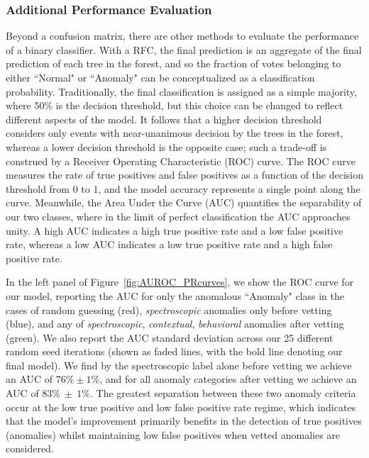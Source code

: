 \documentclass[twocolumn]{aastex63}
\begin{document}
\subsubsection{Additional Performance Evaluation}
\label{subsubsec:add_performance}
Beyond a confusion matrix, there are other methods to evaluate the performance of a binary classifier. With a RFC, the final prediction is an aggregate of the final prediction of each tree in the forest, and so the fraction of votes belonging to either ``Normal" or ``Anomaly" can be conceptualized as a classification probability. Traditionally, the final classification is assigned as a simple majority, where 50\% is the decision threshold, but this choice can be changed to reflect different aspects of the model. It follows that a higher decision threshold considers only events with near-unanimous decision by the trees in the forest, whereas a lower decision threshold is the opposite case; such a trade-off is construed by a Receiver Operating Characteristic (ROC) curve. The ROC curve measures the rate of true positives and false positives as a function of the decision threshold from 0 to 1, and the model accuracy represents a single point along the curve. Meanwhile, the Area Under the Curve (AUC) quantifies the separability of our two classes, where in the limit of perfect classification the AUC approaches unity. A high AUC indicates a high true positive rate and a low false positive rate, whereas a low AUC indicates a low true positive rate and a high false positive rate. \par

In the left panel of Figure~\ref{fig:AUROC_PRcurves}, we show the ROC curve for our model, reporting the AUC for only the anomalous ``Anomaly" class in the cases of random guessing (red), \emph{spectroscopic} anomalies only before vetting (blue), and any of \emph{spectroscopic}, \emph{contextual}, \emph{behavioral} anomalies after vetting (green). We also report the AUC standard deviation across our 25 different random seed iterations (shown as faded lines, with the bold line denoting our final model). We find by the spectroscopic label alone before vetting we achieve an AUC of $76\% \pm 1\%$, and for all anomaly categories after vetting we achieve an AUC of $83\%~\pm~1\%$. The greatest separation between these two anomaly criteria occur at the low true positive and low false positive rate regime, which indicates that the model's improvement primarily benefits in the detection of true positives (anomalies) whilst maintaining low false positives when vetted anomalies are considered. \par
\end{document}
